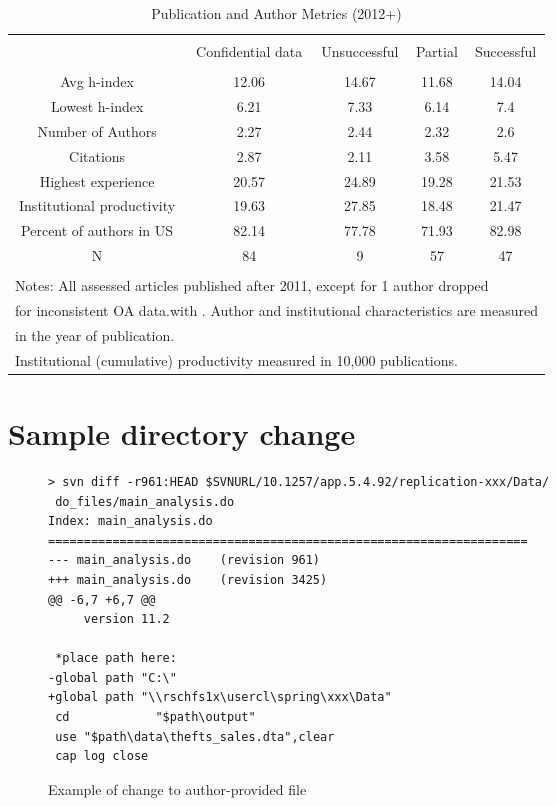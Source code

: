 \documentclass{cje_appendix} %
\theoremstyle{plain}%
\theoremstyle{definition}
\theoremstyle{remark}
\begin{document}
%
\begin{table} \centering 
  \caption{Publication and Author Metrics (2012+)} 
  \label{tab:metrics:OA:zero} 
\begin{tabular}{@{\extracolsep{0.4pt}} ccccc} 
\\[-1.8ex]\hline 
\hline \\[-1.8ex] 
  & Confidential data & Unsuccessful & Partial & Successful \\ 
\hline \\[-1.8ex] 
Avg h-index & 12.06 & 14.67 & 11.68 & 14.04 \\ 
Lowest h-index & 6.21 & 7.33 & 6.14 & 7.4 \\ 
Number of Authors & 2.27 & 2.44 & 2.32 & 2.6 \\ 
Citations & 2.87 & 2.11 & 3.58 & 5.47 \\ 
Highest experience & 20.57 & 24.89 & 19.28 & 21.53 \\ 
Institutional productivity & 19.63 & 27.85 & 18.48 & 21.47 \\ 
Percent of authors in US & 82.14 & 77.78 & 71.93 & 82.98 \\ 
N & 84 & 9 & 57 & 47 \\ 
\hline \\[-1.8ex] 
\multicolumn{5}{l}{Notes: All assessed articles published after 2011, except for 1 author dropped } \\ 
\multicolumn{5}{l}{for inconsistent OA data.with . Author and institutional characteristics are measured } \\ 
\multicolumn{5}{l}{in the year of publication. } \\ 
\multicolumn{5}{l}{Institutional (cumulative) productivity measured in 10,000 publications.} \\ 
\end{tabular} 
\end{table} 
%
\FloatBarrier

\clearpage

\FloatBarrier
\section{Sample directory change}
\label{app:directorychg}

\begin{figure}
\caption{Example of change to author-provided file\label{fig:svndiff}}
\begin{verbatim}
> svn diff -r961:HEAD $SVNURL/10.1257/app.5.4.92/replication-xxx/Data/
 do_files/main_analysis.do
Index: main_analysis.do
===================================================================
--- main_analysis.do	(revision 961)
+++ main_analysis.do	(revision 3425)
@@ -6,7 +6,7 @@
     version 11.2

 *place path here:
-global path "C:\"
+global path "\\rschfs1x\usercl\spring\xxx\Data"
 cd            "$path\output"
 use "$path\data\thefts_sales.dta",clear
 cap log close

\end{verbatim}
\end{figure}
\end{document}
